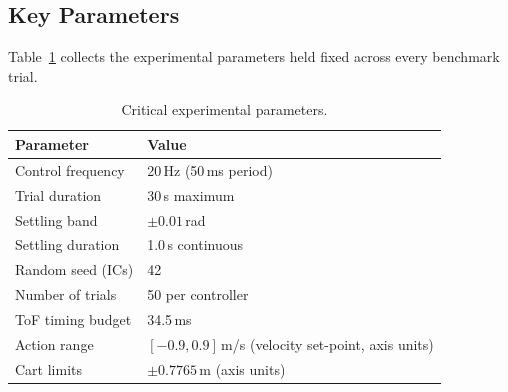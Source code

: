 \subsection{Key Parameters}

Table~\ref{tab:critical_params} collects the experimental parameters
held fixed across every benchmark trial.

\begin{table}[H]
\centering
\caption{Critical experimental parameters.}
\label{tab:critical_params}
\begin{tabular}{ll}
\toprule
\textbf{Parameter} & \textbf{Value} \\
\midrule
Control frequency & 20\,Hz (50\,ms period) \\
Trial duration & 30\,s maximum \\
Settling band & $\pm 0.01$\,rad \\
Settling duration & 1.0\,s continuous \\
Random seed (ICs) & 42 \\
Number of trials & 50 per controller \\
ToF timing budget & 34.5\,ms \\
Action range & $[-0.9, 0.9]$\,m/s (velocity set-point, axis units) \\
Cart limits & $\pm 0.7765$\,m (axis units) \\
\bottomrule
\end{tabular}
\end{table}
